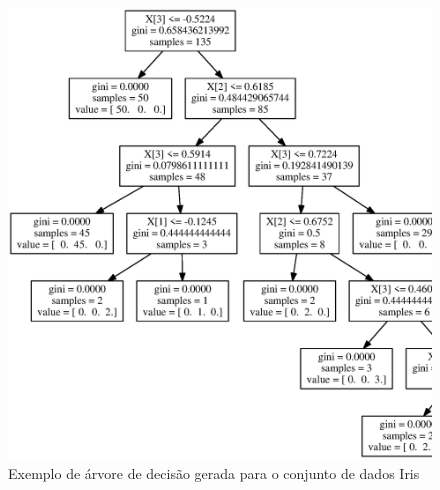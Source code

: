 \documentclass[12pt, a4paper]{article}
\begin{document}
\begin{figure}[!htb]
  \caption{Exemplo de árvore de decisão gerada para o conjunto de dados Iris}
  \centering
  \label{arvdecisao}
    \includegraphics[width=1\textwidth]{Iris/arvore.eps}
\end{figure}

\newpage

\end{document}
